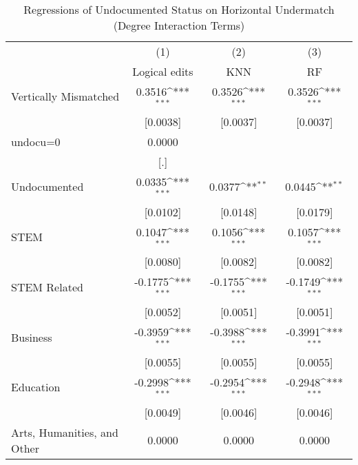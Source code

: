 \begin{table}[htbp]\centering
\def\sym#1{\ifmmode^{#1}\else\(^{#1}\)\fi}
\caption{Regressions of Undocumented Status on Horizontal Undermatch (Degree Interaction Terms)}
\begin{tabular}{l*{3}{c}}
\toprule
                    &\multicolumn{1}{c}{(1)}         &\multicolumn{1}{c}{(2)}         &\multicolumn{1}{c}{(3)}         \\
                    &Logical edits         &         KNN         &          RF         \\
\midrule
Vertically Mismatched&      0.3516\sym{***}&      0.3526\sym{***}&      0.3526\sym{***}\\
                    &    [0.0038]         &    [0.0037]         &    [0.0037]         \\
\addlinespace
undocu=0            &      0.0000         &                     &                     \\
                    &         [.]         &                     &                     \\
\addlinespace
Undocumented        &      0.0335\sym{***}&      0.0377\sym{**} &      0.0445\sym{**} \\
                    &    [0.0102]         &    [0.0148]         &    [0.0179]         \\
\addlinespace
STEM                &      0.1047\sym{***}&      0.1056\sym{***}&      0.1057\sym{***}\\
                    &    [0.0080]         &    [0.0082]         &    [0.0082]         \\
\addlinespace
STEM Related        &     -0.1775\sym{***}&     -0.1755\sym{***}&     -0.1749\sym{***}\\
                    &    [0.0052]         &    [0.0051]         &    [0.0051]         \\
\addlinespace
Business            &     -0.3959\sym{***}&     -0.3988\sym{***}&     -0.3991\sym{***}\\
                    &    [0.0055]         &    [0.0055]         &    [0.0055]         \\
\addlinespace
Education           &     -0.2998\sym{***}&     -0.2954\sym{***}&     -0.2948\sym{***}\\
                    &    [0.0049]         &    [0.0046]         &    [0.0046]         \\
\addlinespace
Arts, Humanities, and Other&      0.0000         &      0.0000         &      0.0000         \\

\end{tabular}
\end{table}
